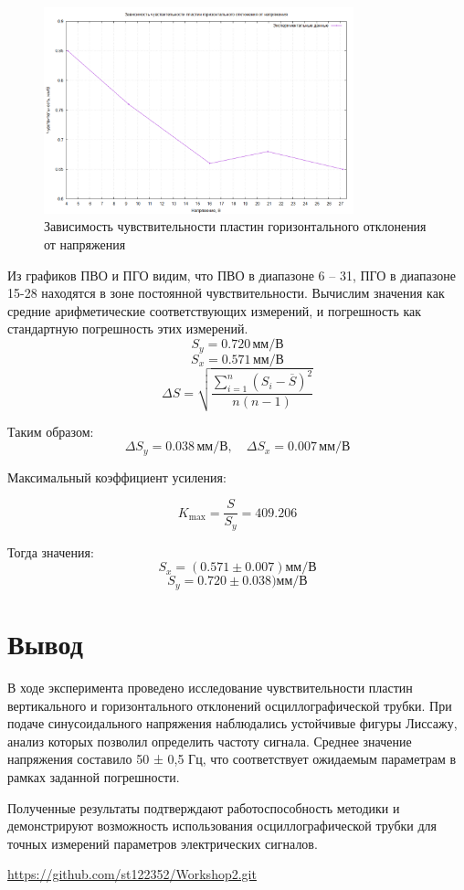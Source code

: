 \begin{figure}[ht!]
\centering
\includegraphics[width=0.8\textwidth]{SensHorizontal_graph.png}
\caption{Зависимость чувствительности пластин горизонтального отклонения от напряжения}
\label{fig:plot}
\end{figure}

Из графиков ПВО и ПГО видим, что ПВО в диапазоне 6 – 31, ПГО в диапазоне 15-28 находятся в зоне постоянной чувствительности. Вычислим значения как средние арифметические соответствующих измерений, и погрешность как стандартную погрешность этих измерений.
\[
S_y = 0.720\, \text{мм/В}
\]
\[
S_x = 0.571 \, \text{мм/В}
\]
\[
\Delta S = \sqrt{\frac{\sum_{i=1}^{n} (S_i - \overline{S})^2}{n(n-1)}}
\]

Таким образом:
\[
\Delta S_y = 0.038 \, \text{мм/В}, \quad \Delta S_x = 0.007 \, \text{мм/В}
\]

Максимальный коэффициент усиления:

\[
K_{\text{max}} = \frac{S}{S_y} = 409.206
\]

Тогда значения:
\[
S_x = (0.571{\pm}0.007) мм/В
\]
\[
S_y = 0.720{\pm}0.038) мм/В
\]


\section{Вывод}
В ходе эксперимента проведено исследование чувствительности пластин вертикального и горизонтального отклонений осциллографической трубки. При подаче синусоидального напряжения наблюдались устойчивые фигуры Лиссажу, анализ которых позволил определить частоту сигнала. Среднее значение напряжения составило 50 ± 0,5 Гц, что соответствует ожидаемым параметрам в рамках заданной погрешности.

Полученные результаты подтверждают работоспособность методики и демонстрируют возможность использования осциллографической трубки для точных измерений параметров электрических сигналов.

\begin{thebibliography}{9}

\url{https://github.com/st122352/Workshop2.git} 

\end{thebibliography}
\clearpage
\appendix